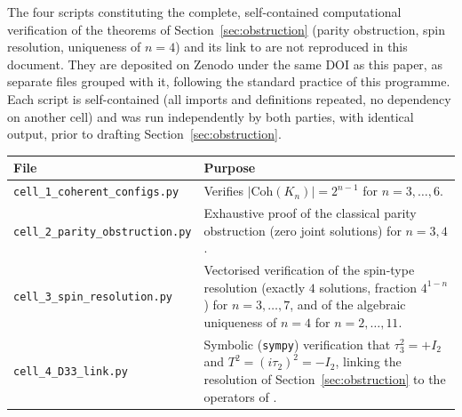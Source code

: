 \documentclass[11pt]{article}
\begin{document}
The four scripts constituting the complete, self-contained computational verification of the theorems of Section~\ref{sec:obstruction} (parity obstruction, spin resolution, uniqueness of $n=4$) and its link to \citep{D33} are not reproduced in this document. They are deposited on Zenodo under the same DOI as this paper, as separate files grouped with it, following the standard practice of this programme. Each script is self-contained (all imports and definitions repeated, no dependency on another cell) and was run independently by both parties, with identical output, prior to drafting Section~\ref{sec:obstruction}.

\begin{center}
\begin{tabularx}{\textwidth}{lY}
\toprule
File & Purpose \\
\midrule
\texttt{cell\_1\_coherent\_configs.py} & Verifies $|\mathrm{Coh}(K_n)|=2^{n-1}$ for $n=3,\ldots,6$. \\
\texttt{cell\_2\_parity\_obstruction.py} & Exhaustive proof of the classical parity obstruction (zero joint solutions) for $n=3,4$. \\
\texttt{cell\_3\_spin\_resolution.py} & Vectorised verification of the spin-type resolution (exactly $4$ solutions, fraction $4^{1-n}$) for $n=3,\ldots,7$, and of the algebraic uniqueness of $n=4$ for $n=2,\ldots,11$. \\
\texttt{cell\_4\_D33\_link.py} & Symbolic (\texttt{sympy}) verification that $\tau_3^2=+I_2$ and $T^2=(i\tau_2)^2=-I_2$, linking the resolution of Section~\ref{sec:obstruction} to the operators of \citep{D33}. \\
\bottomrule
\end{tabularx}
\end{center}
\end{document}

